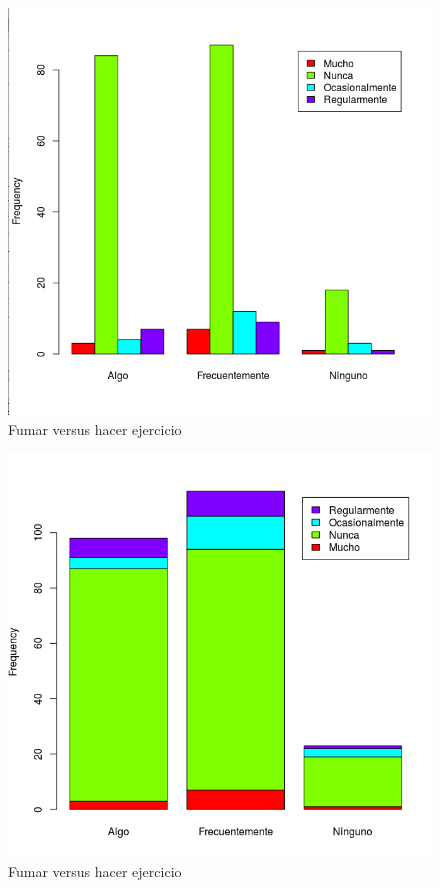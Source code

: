 \documentclass[11pt,evaluacion]{uescimat}
\begin{document}
\begin{problema}
\begin{figure}[H]
\begin{centering}
\includegraphics[scale=0.30]{imagen1.png}
\par\end{centering}
\caption{Fumar versus hacer ejercicio}

\end{figure}


\begin{figure}[H]
\begin{centering}
\includegraphics[scale=0.30]{imagen2.png}
\par\end{centering}
\caption{Fumar versus hacer ejercicio}

\end{figure}



\end{problema}
\end{document}
